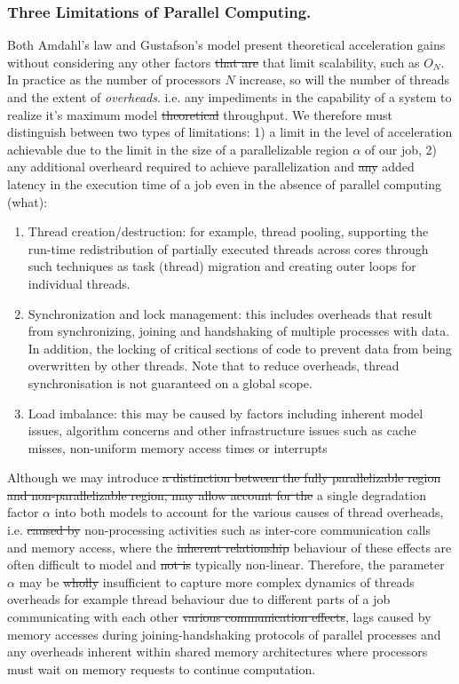 \documentclass[10pt]{article}[draft]
\begin{document}
\subsubsection{Three Limitations of Parallel Computing.}
Both Amdahl's law and Gustafson's model present  theoretical acceleration gains without considering any other  factors \st{that are} that limit scalability, such as $O_N$. In practice as the number of processors $N$ increase, so will the number of threads and the extent of \emph{overheads}. i.e. any impediments in the capability of a system to realize it's maximum model \st{theoretical} throughput. We  therefore must distinguish between two types of limitations: 1) a limit in the level of acceleration achievable due to the limit in the size of a parallelizable region $\alpha$ of our job, 2) any additional overheard required to achieve parallelization and \st{any} added latency in the execution time of a job even in the  absence of parallel computing (what): 
\begin{enumerate}
	\item Thread creation/destruction: for example, thread pooling, supporting the run-time redistribution of partially executed threads across cores through such techniques as task (thread) migration and creating outer loops for individual threads. 
	\item Synchronization and lock management: this includes overheads that result from synchronizing, joining and handshaking of multiple processes with data. In addition, the locking of critical sections of code to
	prevent data from being overwritten by other threads. Note that to reduce overheads, thread synchronisation is not guaranteed on a global scope. 
	\item Load imbalance: this may be caused by factors including inherent model issues, algorithm concerns and other  infrastructure issues such as cache misses, non-uniform memory access times or interrupts %
\end{enumerate}

Although we may introduce \st{a distinction between the fully parallelizable region and non-parallelizable region, may allow account for the} a single degradation factor $\alpha$ into both models to account for the various {causes of} thread overheads, i.e. \st{caused by} non-processing activities such as inter-core communication calls and memory access, where the \st{inherent relationship} behaviour of these effects are often difficult to model and   \st{not is} typically non-linear. Therefore, the parameter $\alpha$ may be \st{wholly} insufficient to capture  more complex dynamics of threads overheads for example thread behaviour due to different parts of a job communicating with each other \st{various communication effects},  lags caused by memory accesses during  joining-handshaking protocols of parallel processes  and any overheads inherent within shared memory architectures where  processors must wait on memory requests to continue computation. 
\end{document}

